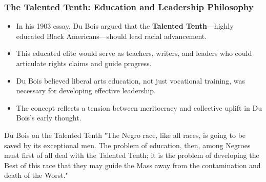 \documentclass{beamer}
\begin{document}
	\begin{frame}
		\frametitle{The Talented Tenth: Education and Leadership Philosophy}
		
		\begin{itemize}
			\item In his 1903 essay, Du Bois argued that the \textbf{Talented Tenth}—highly educated Black Americans—should lead racial advancement.
			\item This educated elite would serve as teachers, writers, and leaders who could articulate rights claims and guide progress.
			\item Du Bois believed liberal arts education, not just vocational training, was necessary for developing effective leadership.
			\item The concept reflects a tension between meritocracy and collective uplift in Du Bois's early thought.
		\end{itemize}
		
		\begin{exampleblock}{Du Bois on the Talented Tenth}
			"The Negro race, like all races, is going to be saved by its exceptional men. The problem of education, then, among Negroes must first of all deal with the Talented Tenth; it is the problem of developing the Best of this race that they may guide the Mass away from the contamination and death of the Worst."
		\end{exampleblock}
		
	\end{frame}
	
\end{document}
